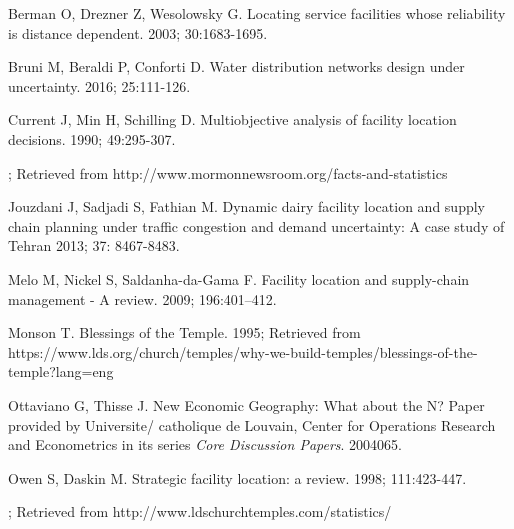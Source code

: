 \documentclass[twoside,twocolumn]{article}
\begin{document}
\begin{thebibliography}{99} %

Berman O, Drezner Z, Wesolowsky G.
\newblock Locating service facilities whose reliability is distance dependent.
 2003; 30:1683-1695.

Bruni M, Beraldi P, Conforti D.
\newblock Water distribution networks design under uncertainty.
 2016; 25:111-126.

Current J, Min H, Schilling D.
\newblock Multiobjective analysis of facility location decisions.
 1990; 49:295-307.

; Retrieved from http://www.mormonnewsroom.org/facts-and-statistics

Jouzdani J, Sadjadi S, Fathian M.
\newblock Dynamic dairy facility location and supply chain planning under traffic congestion and demand uncertainty: A case study of Tehran
 2013; 37: 8467-8483.

Melo M, Nickel S, Saldanha-da-Gama F.
\newblock Facility location and supply-chain management - A review.
  2009; 196:401--412.

Monson T.
\newblock Blessings of the Temple. 1995;
\newblock Retrieved from https://www.lds.org/church/temples/why-we-build-temples/blessings-of-the-temple?lang=eng

Ottaviano G, Thisse J.
\newblock New Economic Geography: What about the N?
\newblock Paper provided by Universite/ catholique de Louvain, Center for Operations Research and Econometrics in its series {\em Core Discussion Papers}. 2004065.

Owen S, Daskin M.
\newblock Strategic facility location: a review.
 1998; 111:423-447.

; Retrieved from http://www.ldschurchtemples.com/statistics/
\end{thebibliography}

\end{document}
